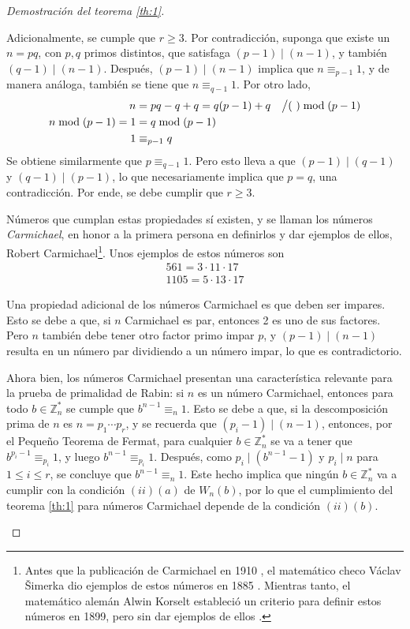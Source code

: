 \documentclass[hidelinks, 12pt]{article}
\newcommand{\Zs}{\mathbb{Z}^*}
\begin{document}
\begin{proof}[Demostración del teorema \ref{th:1}]
\begin{itemize}
\begin{enumerate}
            Adicionalmente, se cumple que $r\geq 3$. Por contradicción, suponga que existe un $n=pq$, con $p,q$ primos distintos, que satisfaga $(p-1)\mid(n-1)$, y también $(q-1)\mid(n-1)$. Después, $(p-1)\mid(n-1)$ implica que $n\equiv_{p-1}1$, y de manera análoga, también se tiene que $n\equiv_{q-1}1$. Por otro lado,
            \begin{align*}
                n&=pq-q+q=q(p-1)+q&&\big{/}(~)\bmod(p-1) \\
                n\bmod(p-1)=1&=q\bmod(p-1) \\
                1&\equiv_{p-1}q
            \end{align*}
            Se obtiene similarmente que $p\equiv_{q-1}1$. Pero esto lleva a que $(p-1)\mid(q-1)$ y $(q-1)\mid(p-1)$, lo que necesariamente implica que $p=q$, una contradicción. Por ende, se debe cumplir que $r\geq 3$.

            Números que cumplan estas propiedades sí existen, y se llaman los números \textit{Carmichael}, en honor a la primera persona en definirlos y dar ejemplos de ellos, Robert Carmichael\footnote{Antes que la publicación de Carmichael en 1910 \cite{Carmichael}, el matemático checo Václav Šimerka dio ejemplos de estos números en 1885 \cite{Simerka}. Mientras tanto, el matemático alemán Alwin Korselt estableció un criterio para definir estos números en 1899, pero sin dar ejemplos de ellos \cite{Korselt}.}. Unos ejemplos de estos números son
            \begin{gather*}
                561=3\cdot 11\cdot 17 \\
                1105=5\cdot 13\cdot 17
            \end{gather*}

            Una propiedad adicional de los números Carmichael es que deben ser impares. Esto se debe a que, si $n$ Carmichael es par, entonces 2 es uno de sus factores. Pero $n$ también debe tener otro factor primo impar $p$, y $(p-1)\mid(n-1)$ resulta en un número par dividiendo a un número impar, lo que es contradictorio.

            Ahora bien, los números Carmichael presentan una característica relevante para la prueba de primalidad de Rabin: si $n$ es un número Carmichael, entonces para todo $b\in\Zs_n$ se cumple que $b^{n-1}\equiv_n1$. Esto se debe a que, si la descomposición prima de $n$ es $n=p_1\dotsm p_r$, y se recuerda que $(p_i-1)\mid(n-1)$, entonces, por el Pequeño Teorema de Fermat, para cualquier $b\in\Zs_n$ se va a tener que $b^{p_i-1}\equiv_{p_i}1$, y luego $b^{n-1}\equiv_{p_i}1$. Después, como $p_i\mid(b^{n-1}-1)$ y $p_i\mid n$ para $1\leq i\leq r$, se concluye que $b^{n-1}\equiv_n 1$. Este hecho implica que ningún $b\in\Zs_n$ va a cumplir con la condición $(ii)(a)$ de $W_n(b)$, por lo que el cumplimiento del teorema \ref{th:1} para números Carmichael depende de la condición $(ii)(b)$.


\end{enumerate}
\end{itemize}
\end{proof}
\end{document}
